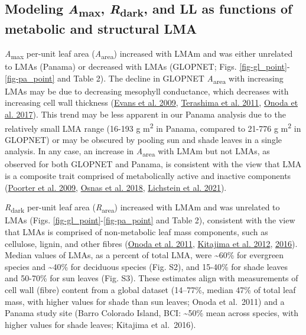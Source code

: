 \documentclass[
  12pt,
  letterpaper,
  DIV=11,
  numbers=noendperiod]{scrartcl}
\begin{document}
\hypertarget{modeling-amax-rdark-and-ll-as-functions-of-metabolic-and-structural-lma}{%
\subsection{\texorpdfstring{Modeling \emph{A}\textsubscript{max},
\emph{R}\textsubscript{dark}, and LL as functions of metabolic and
structural
LMA}{Modeling Amax, Rdark, and LL as functions of metabolic and structural LMA}}\label{modeling-amax-rdark-and-ll-as-functions-of-metabolic-and-structural-lma}}

\emph{A}\textsubscript{max} per-unit leaf area
(\emph{A}\textsubscript{area}) increased with LMAm and was either
unrelated to LMAs (Panama) or decreased with LMAs (GLOPNET; Figs.
\ref{fig-gl_point}-\ref{fig-pa_point} and Table 2). The decline in
GLOPNET \emph{A}\textsubscript{area} with increasing LMAs may be due to
decreasing mesophyll conductance, which decreases with increasing cell
wall thickness (\protect\hyperlink{ref-Evans2009}{Evans et al. 2009},
\protect\hyperlink{ref-Terashima2011}{Terashima et al. 2011},
\protect\hyperlink{ref-Onoda2017}{Onoda et al. 2017}). This trend may be
less apparent in our Panama analysis due to the relatively small LMA
range (16-193 g m\textsuperscript{2} in Panama, compared to 21-776 g
m\textsuperscript{2} in GLOPNET) or may be obscured by pooling sun and
shade leaves in a single analysis. In any case, an increase in
\emph{A}\textsubscript{area} with LMAm but not LMAs, as observed for
both GLOPNET and Panama, is consistent with the view that LMA is a
composite trait comprised of metabolically active and inactive
components (\protect\hyperlink{ref-Poorter2009}{Poorter et al. 2009},
\protect\hyperlink{ref-Osnas2018}{Osnas et al. 2018},
\protect\hyperlink{ref-Lichstein2021}{Lichstein et al. 2021}).

\emph{R}\textsubscript{dark} per-unit leaf area
(\emph{R}\textsubscript{area}) increased with LMAm and was unrelated to
LMAs (Figs. \ref{fig-gl_point}-\ref{fig-pa_point} and Table 2),
consistent with the view that LMAs is comprised of non-metabolic leaf
mass components, such as cellulose, lignin, and other fibres
(\protect\hyperlink{ref-Onoda2011}{Onoda et al. 2011},
\protect\hyperlink{ref-Kitajima2012}{Kitajima et al. 2012},
\protect\hyperlink{ref-Kitajima2016}{2016}). Median values of LMAs, as a
percent of total LMA, were \textasciitilde60\% for evergreen species and
\textasciitilde40\% for deciduous species (Fig. S2), and 15-40\% for
shade leaves and 50-70\% for sun leaves (Fig. S3). These estimates align
with measurements of cell wall (fibre) content from a global dataset
(14--77\%, median 47\% of total leaf mass, with higher values for shade
than sun leaves; Onoda et al.~2011) and a Panama study site (Barro
Colorado Island, BCI: \textasciitilde50\% mean across species, with
higher values for shade leaves; Kitajima et al.~2016).
\end{document}
